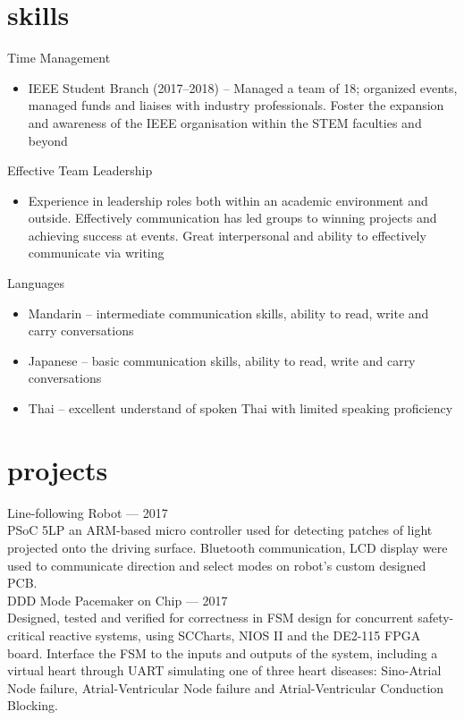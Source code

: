 \documentclass[10pt, a4paper]{article}
\begin{document}
\section{skills}
  Time Management\\
  \begin{itemize}
    \item IEEE Student Branch (2017--2018) -- Managed a team of 18; organized events, managed funds and liaises with industry professionals. Foster the expansion and awareness of the IEEE organisation within the STEM faculties and beyond
  \end{itemize}
  Effective Team Leadership\\
  \begin{itemize}
    \item Experience in leadership roles both within an academic environment and outside. Effectively communication has led groups to winning projects and achieving success at events. Great interpersonal and ability to effectively communicate via writing
  \end{itemize}
  Languages\\
  \begin{itemize}
    \item Mandarin -- intermediate communication skills, ability to read, write and carry conversations
    \item Japanese -- basic communication skills, ability to read, write and carry conversations
    \item Thai -- excellent understand of spoken Thai with limited speaking proficiency
  \end{itemize}

\section{projects}
  Line-following Robot — 2017\\
  PSoC 5LP an ARM-based micro controller used for detecting patches of light projected onto the driving surface. Bluetooth communication, LCD display were used to communicate direction and select modes on robot’s custom designed PCB.\\
  DDD Mode Pacemaker on Chip — 2017\\
  Designed, tested and verified for correctness in FSM design for concurrent safety-critical reactive systems, using SCCharts, NIOS II and the DE2-115 FPGA board. Interface the FSM to the inputs and outputs of the system, including a virtual heart through UART simulating one of three heart diseases: Sino-Atrial Node failure, Atrial-Ventricular Node failure and Atrial-Ventricular Conduction Blocking.\\
\end{document}
